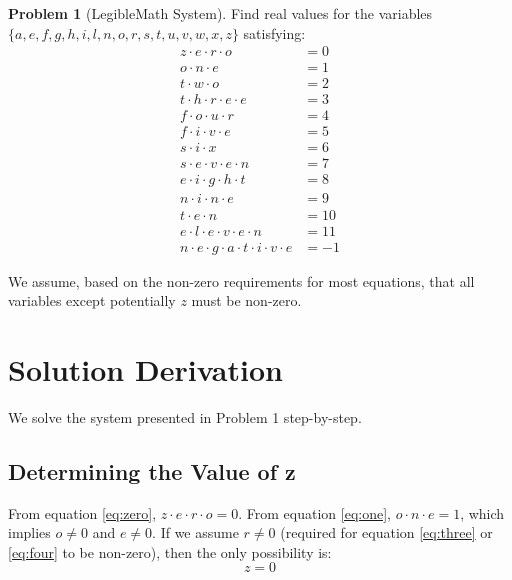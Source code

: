 \documentclass[12pt,a4paper]{article}
\theoremstyle{plain}
\theoremstyle{definition}
\newtheorem{problem}{Problem}
\begin{document}
\begin{problem}[LegibleMath System]
Find real values for the variables \\$\{a, e, f, g, h, i, l, n, o, r, s, t, u, v, w, x, z\}$ satisfying:
\begin{align}
 z \cdot e \cdot r \cdot o &= 0 \label{eq:zero}\\
 o \cdot n \cdot e &= 1 \label{eq:one}\\
 t \cdot w \cdot o &= 2 \label{eq:two}\\
 t \cdot h \cdot r \cdot e \cdot e &= 3 \label{eq:three}\\
 f \cdot o \cdot u \cdot r &= 4 \label{eq:four}\\
 f \cdot i \cdot v \cdot e &= 5 \label{eq:five}\\
 s \cdot i \cdot x &= 6 \label{eq:six}\\
 s \cdot e \cdot v \cdot e \cdot n &= 7 \label{eq:seven}\\
 e \cdot i \cdot g \cdot h \cdot t &= 8 \label{eq:eight}\\
 n \cdot i \cdot n \cdot e &= 9 \label{eq:nine}\\
 t \cdot e \cdot n &= 10 \label{eq:ten}\\
 e \cdot l \cdot e \cdot v \cdot e \cdot n &= 11 \label{eq:eleven}\\
 n \cdot e \cdot g \cdot a \cdot t \cdot i \cdot v \cdot e &= -1 \label{eq:negative}
\end{align}
\end{problem}
\noindent We assume, based on the non-zero requirements for most equations, that all variables except potentially $z$ must be non-zero.

\section{Solution Derivation}
\label{sec:derivation}

We solve the system presented in Problem 1 step-by-step.

\subsection{Determining the Value of z}
From equation \eqref{eq:zero}, $z \cdot e \cdot r \cdot o = 0$. From equation \eqref{eq:one}, $o \cdot n \cdot e = 1$, which implies $o \neq 0$ and $e \neq 0$. If we assume $r \neq 0$ (required for equation \eqref{eq:three} or \eqref{eq:four} to be non-zero), then the only possibility is:
\[ z = 0 \]
\end{document}
